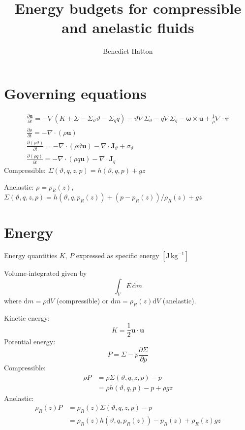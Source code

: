 \documentclass{article}
\title{Energy budgets for compressible and anelastic fluids}
\author{Benedict Hatton}
\begin{document}
\maketitle

\section{Governing equations}
\begin{gather}
    \frac{\partial \mathbf{u}}{\partial t}
    = 
    - \nabla\left(
        K 
        + \Sigma 
        - \Sigma_\vartheta \vartheta
        - \Sigma_q q
        \right)
    - \vartheta \nabla \Sigma_{\vartheta}
    - q \nabla \Sigma_{q}
    - \boldsymbol{\omega}\times \mathbf{u}
    + \frac{1}{\rho} \nabla \cdot \boldsymbol{\tau}
    \\
    \frac{\partial \rho}{\partial t}
    = - \nabla\cdot (\rho \mathbf{u})
    \\
    \frac{\partial (\rho \vartheta)}{\partial t}
    =
    - \nabla\cdot (\rho \vartheta \mathbf{u})
    - \nabla \cdot \mathbf{J}_\vartheta
    + \sigma_{\vartheta}
    \\
    \frac{\partial (\rho q)}{\partial t}
    = 
    - \nabla\cdot (\rho q \mathbf{u})
    - \nabla\cdot \mathbf{J}_{q}
\end{gather}
Compressible: \(\Sigma(\vartheta, q, z, p) = h(\vartheta, q, p) + gz\) 

Anelastic: \(\rho = \rho_R(z)\), \(\Sigma(\vartheta, q, z, p) = h(\vartheta, q, p_R(z)) + (p - p_R(z))/ \rho_R(z) + gz\) 

\section{Energy}
Energy quantities \(K\), \(P\) expressed as specific energy \([\text{J}\,\text{kg}^{-1}]\) 

Volume-integrated given by
\begin{equation}
    \int_{V} E \, \mathrm{d} m
\end{equation}
where \(\mathrm{d}m = \rho \mathrm{d}V\) (compressible) or \(\mathrm{d}m = \rho_R(z) \mathrm{d}V\) (anelastic). 

Kinetic energy:
\begin{equation}
    K = \frac{1}{2} \mathbf{u}\cdot \mathbf{u}
\end{equation}
Potential energy:
\begin{equation}
    P = \Sigma - p \frac{\partial \Sigma}{\partial p} 
\end{equation}
Compressible:
\begin{align}
    \rho P 
    & =
    \rho \Sigma(\vartheta, q, z, p) - p
    \\
    & =
    \rho h(\vartheta, q, p) - p + \rho gz
\end{align}
Anelastic:
\begin{align}
    \rho_R(z) P 
    & = 
    \rho_R(z) \Sigma(\vartheta, q, z, p) - p
    \\
    & = 
    \rho_R(z) h(\vartheta, q, p_R(z)) - p_R(z) + \rho_R(z) gz
\end{align}
\end{document}
